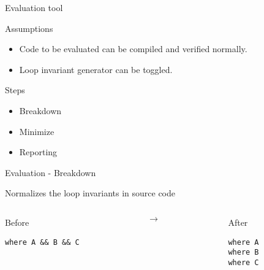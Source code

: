 \begin{frame}{Evaluation tool}

\begin{block}{Assumptions}

\begin{itemize}
\item Code to be evaluated can be compiled and verified normally.
\item Loop invariant generator can be toggled.
\end{itemize}

\end{block}


\begin{block}{Steps}
\begin{itemize}
\item Breakdown
\item Minimize
\item Reporting
\end{itemize}
\end{block}

\end{frame}



\begin{frame}[fragile]{Evaluation - Breakdown}

Normalizes the loop invariants in source code

\begin{columns}
\begin{column}{0.4\textwidth}
\begin{block}{Before}
\begin{verbatim}
where A && B && C
\end{verbatim}
\end{block}
\end{column}
\begin{column}{0.1\textwidth}
$\rightarrow$
\end{column}
\begin{column}{0.4\textwidth}
\begin{block}{After}
\begin{verbatim}
where A
where B
where C
\end{verbatim}
\end{block}
\end{column}
\end{columns}

\end{frame}



